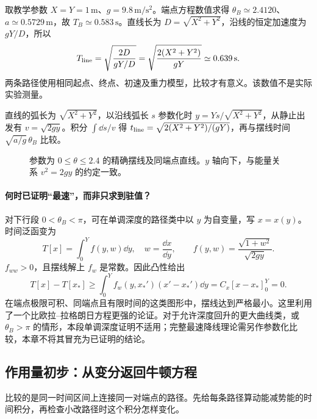 \begin{example}[同一终点下与直线比较]
取教学参数 $X=Y=1\,\mathrm m$、$g=9.8\,\mathrm{m/s^2}$。端点方程数值求得 $\theta_B\simeq2.4120$、$a\simeq0.5729\,\mathrm m$，故 $T_B\simeq0.583\,\mathrm s$。直线长为 $D=\sqrt{X^2+Y^2}$，沿线的恒定加速度为 $gY/D$，所以
\[
T_{\rm line}=\sqrt{\frac{2D}{gY/D}}
=\sqrt{\frac{2(X^2+Y^2)}{gY}}\simeq0.639\,\mathrm s.
\]
两条路径使用相同起点、终点、初速及重力模型，比较才有意义。该数值不是实际实验测量。

直线的弧长为 $\sqrt{X^2+Y^2}$，以沿线弧长 $s$ 参数化时 $y=Ys/\sqrt{X^2+Y^2}$，从静止出发有 $v=\sqrt{2gy}$。积分 $\int\dd s/v$ 得 $t_{\rm line}=\sqrt{2(X^2+Y^2)/(gY)}$，再与摆线时间 $\sqrt{a/g}\,\theta_B$ 比较。
\end{example}
\begin{figure}[htbp]
\centering
{}
\caption{参数为 $0\le\theta\le2.4$ 的精确摆线及同端点直线。$y$ 轴向下，与能量关系 $v^2=2gy$ 的约定一致。}
\label{fig:var-brachistochrone}
\end{figure}

\paragraph{何时已证明“最速”，而非只求到驻值？}
对下行段 $0<\theta_B<\pi$，可在单调深度的路径类中以 $y$ 为自变量，写 $x=x(y)$。时间泛函变为
\[
T[x]=\int_0^Y f(y,w)\dd y,\quad w=\frac{\dd x}{\dd y},\qquad
f(y,w)=\frac{\sqrt{1+w^2}}{\sqrt{2gy}}.
\]
$f_{ww}>0$，且摆线解上 $f_w$ 是常数。因此凸性给出
\[
T[x]-T[x_*]\ge\int_0^Y f_w(y,x_*')(x'-x_*')\dd y
=C_x[x-x_*]_0^Y=0.
\]
在端点极限可积、同端点且有限时间的这类图形中，摆线达到严格最小。这里利用了一个比欧拉--拉格朗日方程更强的论证。对于允许深度回升的更大曲线类，或 $\theta_B>\pi$ 的情形，本段单调深度证明不适用；完整最速降线理论需另作参数化比较，本章不将其冒充为已证明的结论。

\subsection{作用量初步：从变分返回牛顿方程}\label{sec:action-first}
比较的是同一时间区间上连接同一对端点的路径。先给每条路径算动能减势能的时间积分，再检查小改路径时这个积分怎样变化。

